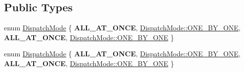 \subsection*{Public Types}
\begin{DoxyCompactItemize}
\item 
enum \hyperlink{classTouch_a3970fe1342ce78786781e8383164983d}{Dispatch\+Mode} \{ {\bfseries A\+L\+L\+\_\+\+A\+T\+\_\+\+O\+N\+CE}, 
\hyperlink{classTouch_a3970fe1342ce78786781e8383164983daa5bba40bd7937ab70cc5eea0b54eed88}{Dispatch\+Mode\+::\+O\+N\+E\+\_\+\+B\+Y\+\_\+\+O\+NE}, 
{\bfseries A\+L\+L\+\_\+\+A\+T\+\_\+\+O\+N\+CE}, 
\hyperlink{classTouch_a3970fe1342ce78786781e8383164983daa5bba40bd7937ab70cc5eea0b54eed88}{Dispatch\+Mode\+::\+O\+N\+E\+\_\+\+B\+Y\+\_\+\+O\+NE}
 \}
\item 
enum \hyperlink{classTouch_a3970fe1342ce78786781e8383164983d}{Dispatch\+Mode} \{ {\bfseries A\+L\+L\+\_\+\+A\+T\+\_\+\+O\+N\+CE}, 
\hyperlink{classTouch_a3970fe1342ce78786781e8383164983daa5bba40bd7937ab70cc5eea0b54eed88}{Dispatch\+Mode\+::\+O\+N\+E\+\_\+\+B\+Y\+\_\+\+O\+NE}, 
{\bfseries A\+L\+L\+\_\+\+A\+T\+\_\+\+O\+N\+CE}, 
\hyperlink{classTouch_a3970fe1342ce78786781e8383164983daa5bba40bd7937ab70cc5eea0b54eed88}{Dispatch\+Mode\+::\+O\+N\+E\+\_\+\+B\+Y\+\_\+\+O\+NE}
 \}
\end{DoxyCompactItemize}
